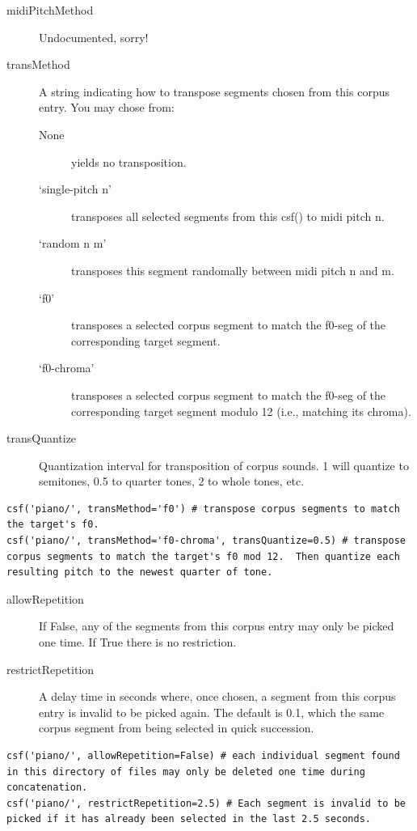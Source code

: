 \documentclass{article}
\begin{document}
\begin{spacing}{1.2}
\begin{description}
\item[midiPitchMethod] Undocumented, sorry!

\item[transMethod] A string indicating how to transpose segments chosen from this corpus entry.  You may chose from:
\begin{description}
\item[None] yields no transposition.
\item[`single-pitch n'] transposes all selected segments from this csf() to midi pitch n.
\item[`random n m'] transposes this segment randomally between midi pitch n and m.
\item[`f0'] transposes a selected corpus segment to match the f0-seg of the corresponding target segment.
\item[`f0-chroma'] transposes a selected corpus segment to match the f0-seg of the corresponding target segment modulo 12 (i.e., matching its chroma).
\end{description}




\item[transQuantize] Quantization interval for transposition of corpus sounds.  1 will quantize to semitones, 0.5 to quarter tones, 2 to whole tones, etc.

\end{description}
\begin{lstlisting}
csf('piano/', transMethod='f0') # transpose corpus segments to match the target's f0.
csf('piano/', transMethod='f0-chroma', transQuantize=0.5) # transpose corpus segments to match the target's f0 mod 12.  Then quantize each resulting pitch to the newest quarter of tone.
\end{lstlisting}
\begin{description}

\item[allowRepetition] If False, any of the segments from this corpus entry may only be picked one time.  If True there is no restriction.

\item[restrictRepetition] A delay time in seconds where, once chosen, a segment from this corpus entry is invalid to be picked again.  The default is 0.1, which the same corpus segment from being selected in quick succession.

\end{description}
\begin{lstlisting}
csf('piano/', allowRepetition=False) # each individual segment found in this directory of files may only be deleted one time during concatenation.
csf('piano/', restrictRepetition=2.5) # Each segment is invalid to be picked if it has already been selected in the last 2.5 seconds.
\end{lstlisting}
\begin{description}



\end{description}
\end{spacing}
\end{document}
